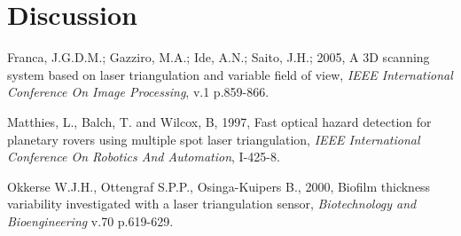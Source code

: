 \documentclass[a4paper]{article}
\begin{document}
\FloatBarrier
\section{Discussion}


\FloatBarrier
%

%
%
%	



\begin{thebibliography}{99}
	 Franca, J.G.D.M.; Gazziro, M.A.; Ide, A.N.; Saito, J.H.; 2005, A 3D scanning system based on laser triangulation and variable field of view, \emph{IEEE International Conference On Image Processing}, v.1 p.859-866.
	
	 Matthies, L., Balch, T. and Wilcox, B, 1997, Fast optical hazard detection for planetary rovers using multiple spot laser triangulation, \emph{IEEE International Conference On Robotics And Automation}, I-425-8.

	 Okkerse W.J.H., Ottengraf S.P.P., Osinga-Kuipers B., 2000, Biofilm thickness variability investigated with a laser triangulation sensor, \emph{Biotechnology and Bioengineering} v.70 p.619-629.	
\end{thebibliography}
\end{document}
